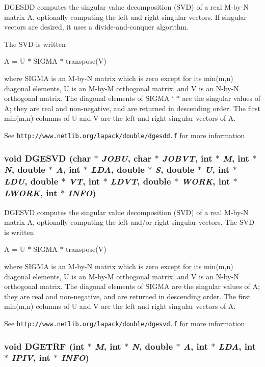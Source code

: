 DGESDD computes the singular value decomposition (SVD) of a real M-by-N matrix A, optionally computing the left and right singular vectors. If singular vectors are desired, it uses a divide-and-conquer algorithm.

The SVD is written

A = U $\ast$ SIGMA $\ast$ transpose(V)

where SIGMA is an M-by-N matrix which is zero except for its min(m,n) diagonal elements, U is an M-by-M orthogonal matrix, and V is an N-by-N orthogonal matrix. The diagonal elements of SIGMA ` $\ast$ are the singular values of A; they are real and non-negative, and are returned in descending order. The first min(m,n) columns of U and V are the left and right singular vectors of A.

See {\tt http://www.netlib.org/lapack/double/dgesdd.f} for more information 
\subsubsection{\setlength{\rightskip}{0pt plus 5cm}void DGESVD (char $\ast$ {\em JOBU}, char $\ast$ {\em JOBVT}, int $\ast$ {\em M}, int $\ast$ {\em N}, double $\ast$ {\em A}, int $\ast$ {\em LDA}, double $\ast$ {\em S}, double $\ast$ {\em U}, int $\ast$ {\em LDU}, double $\ast$ {\em VT}, int $\ast$ {\em LDVT}, double $\ast$ {\em WORK}, int $\ast$ {\em LWORK}, int $\ast$ {\em INFO})}\label{lapack_8h_625b38bcaf6972e4c94f102f4f932d3b_625b38bcaf6972e4c94f102f4f932d3b}


DGESVD computes the singular value decomposition (SVD) of a real M-by-N matrix A, optionally computing the left and/or right singular vectors. The SVD is written

A = U $\ast$ SIGMA $\ast$ transpose(V)

where SIGMA is an M-by-N matrix which is zero except for its min(m,n) diagonal elements, U is an M-by-M orthogonal matrix, and V is an N-by-N orthogonal matrix. The diagonal elements of SIGMA are the singular values of A; they are real and non-negative, and are returned in descending order. The first min(m,n) columns of U and V are the left and right singular vectors of A.

See {\tt http://www.netlib.org/lapack/double/dgesvd.f} for more information 
\subsubsection{\setlength{\rightskip}{0pt plus 5cm}void DGETRF (int $\ast$ {\em M}, int $\ast$ {\em N}, double $\ast$ {\em A}, int $\ast$ {\em LDA}, int $\ast$ {\em IPIV}, int $\ast$ {\em INFO})}\label{lapack_8h_aadc1c986b70147a63d38c36eaa240bf_aadc1c986b70147a63d38c36eaa240bf}


